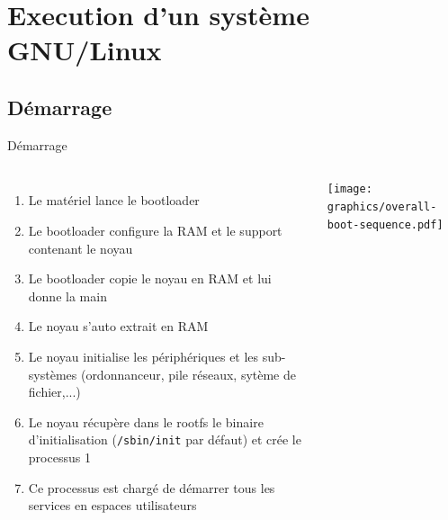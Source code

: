 \section{Execution d'un système GNU/Linux}

\subsection{Démarrage}
\begin{frame}{Démarrage}
  \begin{columns}
    \begin{enumerate}
    \item Le matériel lance le bootloader
    \item Le bootloader configure la RAM et le support contenant le noyau
    \item Le bootloader copie le noyau en RAM et lui donne la main
    \item Le noyau s'auto extrait en RAM
    \item Le noyau initialise les périphériques et les sub-systèmes (ordonnanceur, pile réseaux, sytème de fichier,...)
    \item Le noyau récupère dans le rootfs le binaire d'initialisation (\texttt{/sbin/init} par défaut) et crée le processus 1
    \item Ce processus est chargé de démarrer tous les services en espaces utilisateurs
    \end{enumerate}
    \begin{center}
      \texttt{[image: graphics/overall-boot-sequence.pdf]}
    \end{center}
  \end{columns}
\end{frame}

